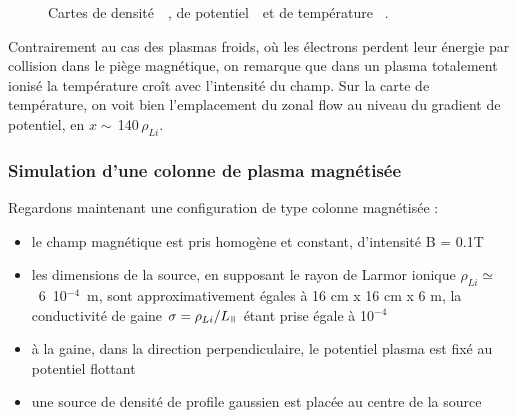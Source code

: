\begin{refsection}
\begin{figure}[!htbp]
    \caption{Cartes de densité~~, de
    potentiel~~et de température
   ~.}
    \label{2-CartesWithTeFiltre}
	\end{figure}
	
Contrairement au cas des plasmas froids, où les électrons perdent leur énergie
par collision dans le piège magnétique, on
remarque que dans un plasma totalement ionisé la température croît avec
l'intensité du champ. Sur la carte de température, on voit bien l'emplacement du
zonal flow au niveau du gradient de potentiel, en $x\sim\,$140$\,\rho_{Li}$.
	
\subsubsection{Simulation d'une colonne de plasma magnétisée}
Regardons maintenant une configuration de type colonne magnétisée : 

\begin{itemize}
  \item le champ magnétique est pris homogène et constant, d'intensité B = 0.1T
  \item les dimensions de la source, en supposant le rayon de Larmor ionique
  $\rho_{Li}\simeq$~6~10$^{-4}$~m, sont approximativement égales à 16 cm x
  16 cm x 6 m, la conductivité de gaine $\sigma=\rho_{Li}/L_\para$ étant prise
  égale à 10$^{-4}$
  \item à la gaine, dans la direction perpendiculaire, le potentiel plasma est
  fixé au potentiel flottant
  \item une source de densité de profile gaussien est placée au centre de la
  source
\end{itemize}


\end{refsection}
